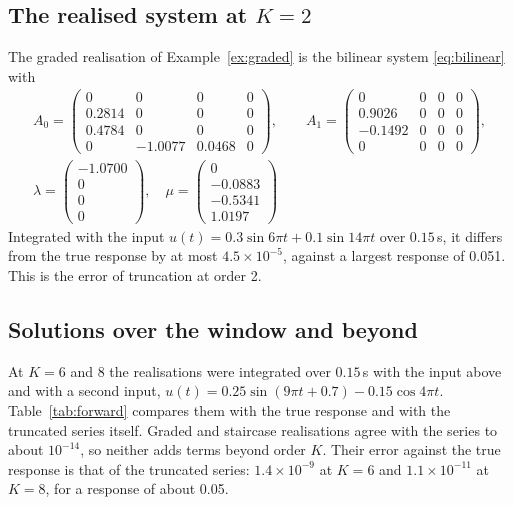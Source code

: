 \documentclass[11pt,a4paper]{article}
\theoremstyle{remark}
\begin{document}
\subsection{The realised system at $K=2$}\label{sec:ode}
The graded realisation of Example~\ref{ex:graded} is the bilinear system \eqref{eq:bilinear} with
\begin{gather*}
A_0=\begin{pmatrix}0 & 0 & 0 & 0\\0.2814 & 0 & 0 & 0\\0.4784 & 0 & 0 & 0\\0 & -1.0077 & 0.0468 & 0\end{pmatrix},\qquad A_1=\begin{pmatrix}0 & 0 & 0 & 0\\0.9026 & 0 & 0 & 0\\-0.1492 & 0 & 0 & 0\\0 & 0 & 0 & 0\end{pmatrix},\\ \lambda=\begin{pmatrix}-1.0700\\0\\0\\0\end{pmatrix},\quad \mu=\begin{pmatrix}0\\-0.0883\\-0.5341\\1.0197\end{pmatrix}
\end{gather*}
Integrated with the input $u(t)=0.3\sin 6\pi t+0.1\sin 14\pi t$ over $0.15$\,s, it differs from the true response by at most $4.5\times10^{-5}$, against a largest response of 0.051.
This is the error of truncation at order 2.

\subsection{Solutions over the window and beyond}\label{sec:forward}
At $K=6$ and $8$ the realisations were integrated over $0.15$\,s with the input above and with a second input, $u(t)=0.25\sin(9\pi t+0.7)-0.15\cos 4\pi t$.
Table~\ref{tab:forward} compares them with the true response and with the truncated series itself.
Graded and staircase realisations agree with the series to about $10^{-14}$, so neither adds terms beyond order $K$.
Their error against the true response is that of the truncated series: $1.4\times10^{-9}$ at $K=6$ and $1.1\times10^{-11}$ at $K=8$, for a response of about 0.05.
\end{document}
